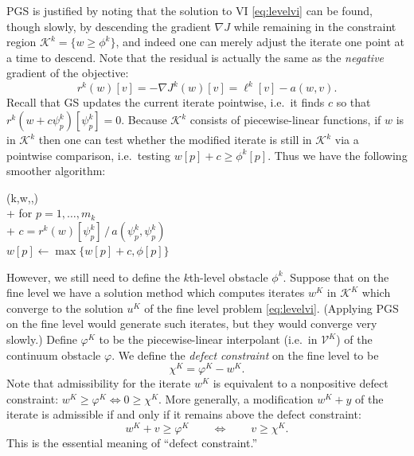 \documentclass[letterpaper,final,12pt,reqno]{amsart}
\newcommand{\grad}{\nabla}
\numberwithin{equation}{section}
\numberwithin{figure}{section}
\numberwithin{table}{section}
\begin{document}
PGS is justified by noting that the solution to VI \eqref{eq:levelvi} can be found, though slowly, by descending the gradient $\grad J$ while remaining in the constraint region $\mathcal{K}^k = \{w\ge \phi^k\}$, and indeed one can merely adjust the iterate one point at a time to descend.  Note that the residual is actually the same as the \emph{negative} gradient of the objective:
\begin{equation}
  r^k(w)[v] = - \grad J^k(w)[v] = \ell^k[v] - a(w,v).  \label{eq:levelresidualgradient}
\end{equation}
Recall that GS updates the current iterate pointwise, i.e.~it finds $c$ so that $r^k(w+c\psi_p^k)[\psi_p^k]=0$.  Because $\mathcal{K}^k$ consists of piecewise-linear functions, if $w$ is in $\mathcal{K}^k$ then one can test whether the modified iterate is still in $\mathcal{K}^k$ via a pointwise comparison, i.e.~testing $w[p] + c \ge \phi^k[p]$.  Thus we have the following smoother algorithm:
\begin{pseudo*}
(k,w,\ell,\phi)\text{:} \\+
    for $p=1,\dots,m_k$ \\+
        $\displaystyle c = r^k(w)[\psi_p^k] \, \big/ \,a(\psi_p^k,\psi_p^k)$ \qquad {} \\
        $w[p] \gets \max\{w[p] + c,\phi[p]\}$
\end{pseudo*}

However, we still need to define the $k$th-level obstacle $\phi^k$.  Suppose that on the fine level we have a solution method which computes iterates $w^K$ in $\mathcal{K}^K$ which converge to the solution $u^K$ of the fine level problem \eqref{eq:levelvi}.  (Applying PGS on the fine level would generate such iterates, but they would converge very slowly.)  Define $\varphi^K$ to be the piecewise-linear interpolant (i.e.~in $\mathcal{V}^K$) of the continuum obstacle $\varphi$.  We define the \emph{defect constraint} \cite{GraeserKornhuber2009} on the fine level to be
\begin{equation}
  \chi^K = \varphi^K - w^K.  \label{eq:defectconstraint}
\end{equation}
Note that admissibility for the iterate $w^K$ is equivalent to a nonpositive defect constraint: $w^K \ge \varphi^K \iff 0 \ge \chi^K$.  More generally, a modification $w^K + y$ of the iterate is admissible if and only if it remains above the defect constraint:
\begin{equation}
  w^K + v \ge \varphi^K  \qquad \iff \qquad v \ge \chi^K.  \label{eq:defectmeaning}
\end{equation}
This is the essential meaning of ``defect constraint.''
\end{document}
